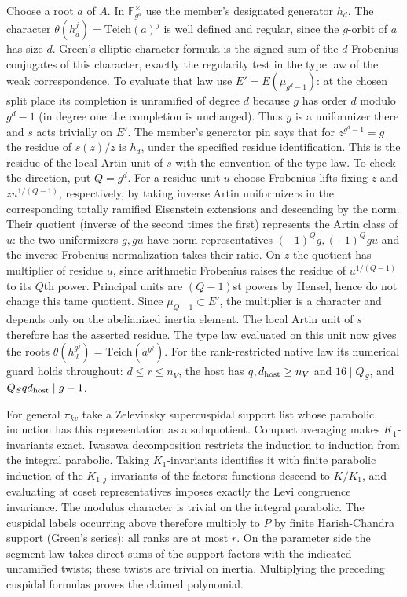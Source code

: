 Choose a root $a$ of $A$. In $\mathbb F_{g^d}^\times$ use the
member's designated generator $h_d$. The character
$\theta(h_d^j)=\mathrm{Teich}(a)^j$ is well defined and regular,
since the $g$-orbit of $a$ has size $d$. Green's elliptic character
formula is the signed sum of the $d$ Frobenius conjugates of this
character, exactly the regularity test in the type law of the weak
correspondence. To evaluate that law use $E'=E(\mu_{g^d-1})$:
at the chosen split place its completion is unramified of degree $d$
because $g$ has order $d$ modulo $g^d-1$ (in degree one the
completion is unchanged). Thus $g$ is a uniformizer there and
$s$ acts trivially on $E'$. The member's generator pin says that
for $z^{g^d-1}=g$ the residue of $s(z)/z$ is $h_d$, under the
specified residue identification. This is the residue of the local
Artin unit of $s$ with the convention of the type law. To check
the direction, put $Q=g^d$. For a residue unit $u$ choose
Frobenius lifts fixing $z$ and $z u^{1/(Q-1)}$, respectively,
by taking inverse Artin uniformizers in the corresponding totally
ramified Eisenstein extensions and descending by the norm.
Their quotient (inverse of the second times the first) represents
the Artin class of $u$: the two uniformizers $g,gu$ have norm
representatives $(-1)^Qg,(-1)^Qgu$ and the inverse Frobenius
normalization takes their ratio. On $z$ the quotient has multiplier
of residue $u$, since arithmetic Frobenius raises the residue
of $u^{1/(Q-1)}$ to its $Q$th power. Principal units are
$(Q-1)$st powers by Hensel, hence do not change this tame
quotient. Since $\mu_{Q-1}\subset E'$, the multiplier is a
character and depends only on the abelianized inertia element.
The local Artin unit of $s$ therefore has the asserted residue.
The type law evaluated on this unit now gives the roots
$\theta(h_d^{g^j})=\mathrm{Teich}(a^{g^j})$. For the
rank-restricted native law its numerical guard holds throughout:
$d\le r\le n_V$, the host has $q,d_{\rm host}\ge n_V$ and
$16\mid Q_S$, and $Q_S q d_{\rm host}\mid g-1$.

For general $\pi_{kv}$ take a Zelevinsky supercuspidal support
list whose parabolic induction has this representation as a
subquotient. Compact averaging makes $K_1$-invariants exact.
Iwasawa decomposition restricts the induction to induction from
the integral parabolic. Taking $K_1$-invariants identifies it with
finite parabolic induction of the $K_{1,j}$-invariants of the
factors: functions descend to $K/K_1$, and evaluating at coset
representatives imposes exactly the Levi congruence invariance.
The modulus character is trivial on the integral parabolic.
The cuspidal labels occurring above therefore multiply to $P$
by finite Harish-Chandra support (Green's series); all ranks are
at most $r$. On the parameter side the segment law takes direct
sums of the support factors with the indicated unramified twists;
these twists are trivial on inertia. Multiplying the preceding
cuspidal formulas proves the claimed polynomial.


